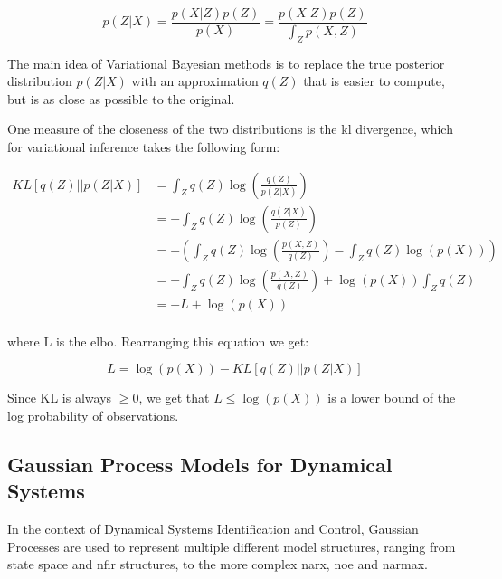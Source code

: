 \begin{equation}
    p(Z|X) = \frac{p(X|Z)p(Z)}{p(X)} = \frac{p(X|Z)p(Z)}{\int_Z p(X,Z)}
\end{equation}

The main idea of Variational Bayesian methods is to replace the true posterior
distribution $p(Z|X)$ with an approximation $q(Z)$ that is easier to compute,
but is as close as possible to the original. 

One measure of the closeness of the two distributions is the \acrfull{kl}
divergence, which for variational inference takes the following form:


\vspace{5pt}
\begin{equation}
    \begin{aligned}
        KL\left[q(Z)||p(Z|X)\right] 
        &= \int_Z q(Z)\log{\left(\frac{q(Z)}{p(Z|X)}\right)} \\
        &= - \int_Z q(Z)\log{\left(\frac{q(Z|X)}{p(Z)}\right)} \\
        &= - \left(
                \int_Z q(Z)\log{\left(\frac{p(X,Z)}{q(Z)}\right)}
                        - \int_Z q(Z)\log{\left(p(X)\right)}
            \right) \\
        &= - \int_Z q(Z) \log{\left(\frac{p(X,Z)}{q(Z)}\right)}
            + \log{\left(p(X)\right)}\int_Z q(Z) \\
        &= -L + \log{\left(p(X)\right)} \\
    \end{aligned}
\end{equation}
\vspace{5pt}

where L is the \acrfull{elbo}. Rearranging this equation we get: 

\begin{equation}
    L = \log{\left(p(X)\right)} - KL\left[q(Z)||p(Z|X)\right] 
\end{equation}

Since KL is always $\geq 0$, we get that $L \leq \log{\left(p(X)\right)}$ is a
lower bound of the log probability of observations.

\subsection{Gaussian Process Models for Dynamical
Systems}\label{sec:gp_dynamical_system}

In the context of Dynamical Systems Identification and Control, Gaussian
Processes are used to represent multiple different model structures, ranging
from state space and \acrshort{nfir} structures, to the more complex
\acrshort{narx}, \acrshort{noe} and \acrshort{narmax}. 


